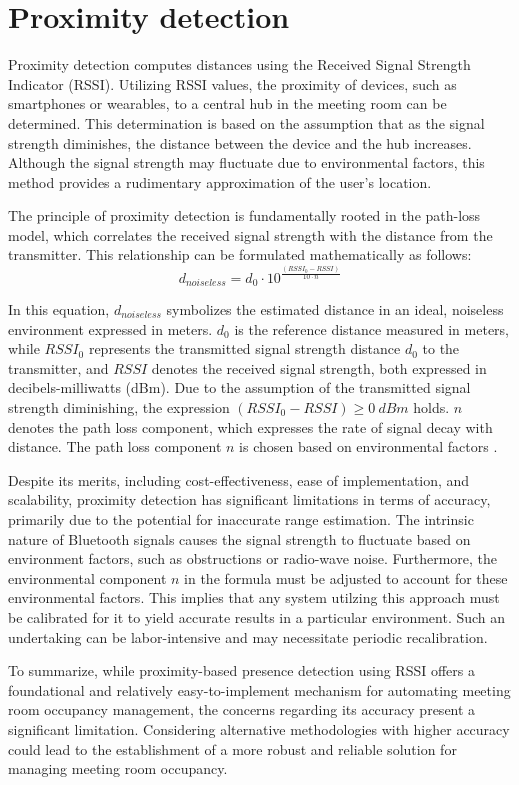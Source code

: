\section{Proximity detection}\label{sec:proximity_detection}
Proximity detection computes distances using the Received Signal Strength Indicator (RSSI).
Utilizing RSSI values, the proximity of devices, such as smartphones or wearables, to a central hub in the meeting room can be determined. 
This determination is based on the assumption that as the signal strength diminishes, the distance between the device and the hub increases. 
Although the signal strength may fluctuate due to environmental factors, this method provides a rudimentary approximation of the user's location.\cite{spachosBLEBeaconsIndoor2020}

The principle of proximity detection is fundamentally rooted in the path-loss model, which correlates the received signal strength with the distance from the transmitter. This relationship can be formulated mathematically as follows:\cite{spachosBLEBeaconsIndoor2020}
$$
d_{noiseless} = d_0 \cdot 10^{ \frac{(RSSI_{0} - RSSI)}{10 \cdot n}}
$$

In this equation, \(d_{noiseless}\) symbolizes the estimated distance in an ideal, noiseless environment expressed in meters.
$d_0$ is the reference distance measured in meters, while \(RSSI_{0}\) represents the transmitted signal strength distance $d_0$ to the transmitter, and \(RSSI\) denotes the received signal strength, both expressed in decibels-milliwatts (dBm). 
Due to the assumption of the transmitted signal strength diminishing, the expression $(RSSI_{0} - RSSI) \geq 0\ dBm$ holds. 
\(n\) denotes the path loss component, which expresses the rate of signal decay with distance.  
The path loss component \(n\) is chosen based on environmental factors \cite{spachosBLEBeaconsIndoor2020}. 

Despite its merits, including cost-effectiveness, ease of implementation, and scalability, proximity detection has significant limitations in terms of accuracy, primarily due to the potential for inaccurate range estimation. 
The intrinsic nature of Bluetooth signals causes the signal strength to fluctuate based on environment factors, such as obstructions or radio-wave noise.\cite{spachosBLEBeaconsIndoor2020} 
Furthermore, the environmental component $n$ in the formula must be adjusted to account for these environmental factors.  
This implies that any system utilzing this approach must be calibrated for it to yield accurate results in a particular environment. 
Such an undertaking can be labor-intensive and may necessitate periodic recalibration.\cite{spachosBLEBeaconsIndoor2020}

To summarize, while proximity-based presence detection using RSSI offers a foundational and relatively easy-to-implement mechanism for automating meeting room occupancy management, the concerns regarding its accuracy present a significant limitation. 
Considering alternative methodologies with higher accuracy could lead to the establishment of a more robust and reliable solution for managing meeting room occupancy.

